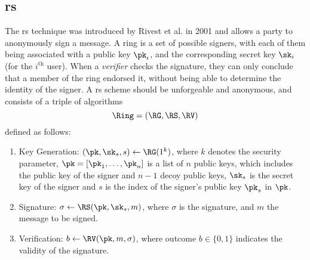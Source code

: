 \subsection{\acrlong{rs}}
The \acrlong{rs} technique was introduced by Rivest et al. in 2001 \cite{rivest2001leak} and allows a party to anonymously sign a message. A ring is a set of possible signers, with each of them being associated with a public key $\pk_i$, and the corresponding secret key $\sk_i$ (for the $i^{\text{th}}$ user). When a \textit{verifier} checks the signature, they can only conclude that a member of the ring endorsed it, without being able to determine the identity of the signer. A \gls{rs} scheme should be unforgeable and anonymous, and consists of a triple of \ppt algorithms
\begin{equation*}
    \Ring=(\RG, \RS, \RV)
\end{equation*}
defined as follows:
\begin{enumerate}
\item Key Generation: $(\pk,\sk_s,s) \gets \RG(1^k)$, where $k$ denotes the security parameter, $\pk=[\pk_1, \dots, \pk_n]$ is a list of $n$ public keys, which includes the public key of the signer and $n-1$ decoy public keys, $\sk_s$ is the secret key of the signer and $s$ is the index of the signer's public key $\pk_s$ in $\pk$.
\item Signature: $\sigma \gets \RS(\pk,\sk_s,m)$, where $\sigma$ is the signature, and $m$ the message to be signed.
\item Verification: $b \gets \RV(\pk,m,\sigma)$, where outcome $b\in\{0,1\}$ indicates the validity of the signature.
\end{enumerate}

